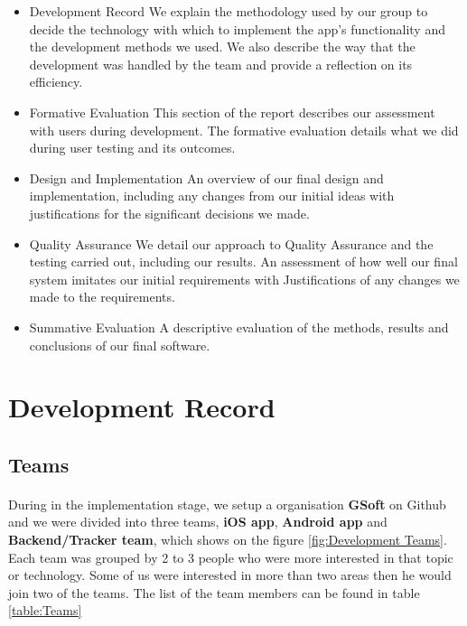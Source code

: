 \documentclass[12pt,a4paper]{article}
\begin{document}
      \begin{itemize}
        \item {Development Record}
          We explain the methodology used by our group to decide the technology with which to implement the app’s functionality and the development methods we used. We also describe the way that the development was handled by the team and provide a reflection on its efficiency.

        \item {Formative Evaluation}
          This section of the report describes our assessment with users during development. The formative evaluation details what we did during user testing and its outcomes.

        \item { Design and Implementation }
          An overview of our final design and implementation, including any changes from our initial ideas with justifications for the significant decisions we made.

        \item { Quality Assurance}
          We detail our approach to Quality Assurance and the testing carried out, including our results. An assessment of how well our final system imitates our initial requirements with Justifications of any changes we made to the requirements.

        \item { Summative Evaluation}
          A descriptive evaluation of the methods, results and conclusions of our final software.
      \end{itemize}

    \section{Development Record}
      \subsection{Teams} 
        \paragraph{}During in the implementation stage, we setup a organisation {\bf GSoft} on Github and we were divided into three teams, {\bf iOS app}, {\bf Android app} and {\bf Backend/Tracker team}, which shows on the figure \ref{fig:Development Teams}. Each team was grouped by 2 to 3 people who were more interested in that topic or technology. Some of us were interested in more than two areas then he would join two of the teams. The list of the team members can be found in table \ref{table:Teams} 
\end{document}
